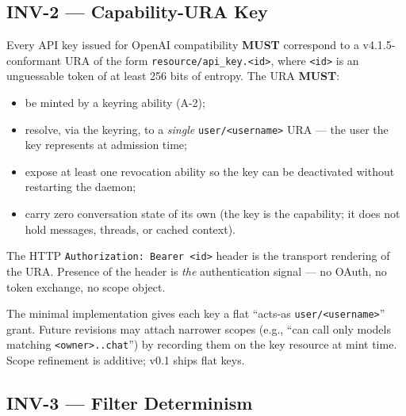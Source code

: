 \documentclass[11pt,a4paper]{article}
\theoremstyle{definition}
\begin{document}
\subsection{INV-2 --- Capability-URA Key}

\begin{invariant}
Every API key issued for OpenAI compatibility \textbf{MUST}
correspond to a v4.1.5-conformant URA of the form
\texttt{resource/api\_key.<id>}, where \texttt{<id>} is an
unguessable token of at least 256 bits of entropy. The URA
\textbf{MUST}:
\begin{itemize}[leftmargin=2em,itemsep=0.1em]
    \item be minted by a keyring ability (A-2);
    \item resolve, via the keyring, to a \emph{single}
    \texttt{user/<username>} URA --- the user the key
    represents at admission time;
    \item expose at least one revocation ability so the key
    can be deactivated without restarting the daemon;
    \item carry zero conversation state of its own (the key is
    the capability; it does not hold messages, threads, or
    cached context).
\end{itemize}
The HTTP \texttt{Authorization: Bearer <id>} header is the
transport rendering of the URA. Presence of the header is
\emph{the} authentication signal --- no OAuth, no token
exchange, no scope object.
\end{invariant}

\begin{notebox}
The minimal implementation gives each key a flat ``acts-as
\texttt{user/<username>}'' grant. Future revisions may attach
narrower scopes (e.g., ``can call only models matching
\texttt{<owner>.\*.chat}'') by recording them on the key
resource at mint time. Scope refinement is additive;
v0.1 ships flat keys.
\end{notebox}

\subsection{INV-3 --- Filter Determinism}
\end{document}
